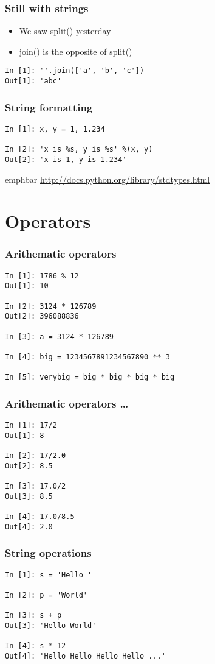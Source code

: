 \documentclass[14pt,compress]{beamer}
\newcommand{\emphbar}[1]
{\begin{beamercolorbox}[rounded=true]{emphbar} 
      {#1}
 \end{beamercolorbox}
}
\newcounter{time}
\newcommand{\inctime}[1]{\addtocounter{time}{#1}{\tiny \thetime\ m}}
\begin{document}
\begin{frame}[fragile]
\frametitle{Still with strings}
  \begin{itemize}
    \item We saw split() yesterday
    \item join() is the opposite of split()
  \end{itemize}
  \begin{lstlisting}
In [1]: ''.join(['a', 'b', 'c'])
Out[1]: 'abc'
  \end{lstlisting}
\end{frame}

\begin{frame}[fragile]
\frametitle{String formatting}
  \begin{lstlisting}
In [1]: x, y = 1, 1.234

In [2]: 'x is %s, y is %s' %(x, y)
Out[2]: 'x is 1, y is 1.234'
  \end{lstlisting}
  \emphbar{\url{http://docs.python.org/library/stdtypes.html}}
  \inctime{10}
\end{frame}

\section{Operators}
\begin{frame}[fragile]
  \frametitle{Arithematic operators}
  \begin{lstlisting}
In [1]: 1786 % 12
Out[1]: 10

In [2]: 3124 * 126789
Out[2]: 396088836

In [3]: a = 3124 * 126789

In [4]: big = 1234567891234567890 ** 3

In [5]: verybig = big * big * big * big
  \end{lstlisting}
\end{frame}

\begin{frame}[fragile]
  \frametitle{Arithematic operators \ldots}
  \begin{lstlisting}
In [1]: 17/2
Out[1]: 8

In [2]: 17/2.0
Out[2]: 8.5

In [3]: 17.0/2
Out[3]: 8.5

In [4]: 17.0/8.5
Out[4]: 2.0
  \end{lstlisting}
\end{frame}

\begin{frame}[fragile]
  \frametitle{String operations}
  \begin{lstlisting}
In [1]: s = 'Hello '

In [2]: p = 'World'

In [3]: s + p 
Out[3]: 'Hello World'

In [4]: s * 12 
Out[4]: 'Hello Hello Hello Hello ...'
  \end{lstlisting}
\end{frame}
\end{document}

